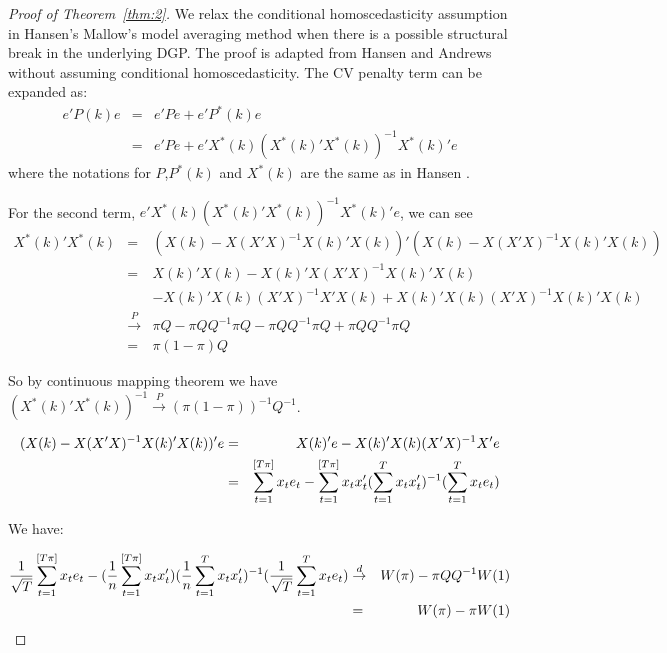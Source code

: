 \begin{proof}[Proof of Theorem~\ref{thm:2}]
We relax the conditional homoscedasticity assumption in Hansen's Mallow's model averaging method when there is a possible structural break in the underlying DGP. The proof is adapted from Hansen \cite{hansen2009averaging} and Andrews \cite{andrews93} without assuming conditional homoscedasticity. The CV penalty term can be expanded as:
\begin{eqnarray*}
e'P(k)e & = & e'Pe + e'P^{*}(k)e \\
        & = & e'Pe + e'X^{*}(k)(X^{*}(k)'X^{*}(k))^{-1}X^{*}(k)'e
\end{eqnarray*}
where the notations for $P$,$P^{*}(k)$ and $X^{*}(k)$ are the same as in Hansen \cite{hansen2009averaging}.

For the second term, $e'X^{*}(k)(X^{*}(k)'X^{*}(k))^{-1}X^{*}(k)'e$, we can see
\begin{eqnarray*}
X^{*}(k)'X^{*}(k) & = & (X(k)-X(X'X)^{-1}X(k)'X(k))'(X(k)-X(X'X)^{-1}X(k)'X(k)) \\
                  & = & X(k)'X(k) - X(k)'X(X'X)^{-1}X(k)'X(k) \\
				  &   & - X(k)'X(k)(X'X)^{-1}X'X(k) + X(k)'X(k)(X'X)^{-1}X(k)'X(k) \\
				  & \stackrel{P}{\rightarrow} & \pi Q - \pi QQ^{-1} \pi Q - \pi QQ^{-1} \pi Q + \pi QQ^{-1} \pi Q \\
				  & = & \pi (1-\pi)Q
\end{eqnarray*}

So by continuous mapping theorem we have $(X^{*}(k)'X^{*}(k))^{-1}\stackrel{P}{\rightarrow}(\pi (1-\pi))^{-1}Q^{-1}$.

\begin{eqnarray*}
(X(k) - X(X'X)^{-1}X(k)'X(k))'e & = & X(k)'e - X(k)'X(k)(X'X)^{-1}X'e \\
                                & = & \sum_{t=1}^{[T \pi]} x_t e_t - \sum_{t=1}^{[T \pi]} x_t x_t'(\sum_{t=1}^{T} x_t x_t')^{-1}(\sum_{t=1}^{T} x_t e_t)
\end{eqnarray*}

We have:

\begin{eqnarray*}
\frac{1}{\sqrt{T}} \sum_{t=1}^{[T \pi]} x_t e_t - (\frac{1}{n} \sum_{t=1}^{[T \pi]} x_t x_t')(\frac{1}{n} \sum_{t=1}^{T} x_t x_t')^{-1}(\frac{1}{\sqrt{T}} \sum_{t=1}^{T} x_t e_t) & \stackrel{d}{\rightarrow} & W(\pi) - \pi Q Q^{-1}W(1) \\
                                                                                                   & =                         & W(\pi) - \pi W(1)
\end{eqnarray*}


\end{proof}
